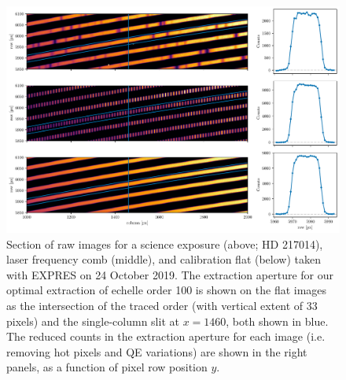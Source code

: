 \begin{figure}
    \centering
    \includegraphics[width=\textwidth]{figures-4/extraction.pdf}
    \caption[EXPRES order cross-sections]{Section of raw images for a science exposure (above; HD 217014), laser frequency comb (middle), and calibration flat (below) taken with EXPRES on 24 October 2019. The extraction aperture for our optimal extraction of echelle order 100 is shown on the flat images as the intersection of the traced order (with vertical extent of 33 pixels) and the single-column slit at $x = 1460$, both shown in blue. The reduced counts in the extraction aperture for each image (i.e. removing hot pixels and QE variations) are shown in the right panels, as a function of pixel row position $y$.}
    \label{fig:extraction}
\end{figure}

